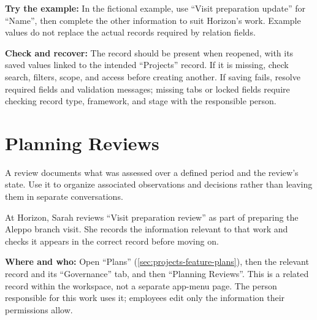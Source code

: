 \textbf{Try the example:} In the fictional example, use “Visit preparation update” for “Name”, then complete the other information to suit Horizon's work. Example values do not replace the actual records required by relation fields.

\textbf{Check and recover:} The record should be present when reopened, with its saved values linked to the intended “Projects” record. If it is missing, check search, filters, scope, and access before creating another. If saving fails, resolve required fields and validation messages; missing tabs or locked fields require checking record type, framework, and stage with the responsible person.

\clearpage
\section{Planning Reviews}
\label{sec:projects-feature-planning-reviews}

A review documents what was assessed over a defined period and the review's state. Use it to organize associated observations and decisions rather than leaving them in separate conversations.

\begin{rcnote}
At Horizon, Sarah reviews “Visit preparation review” as part of preparing the Aleppo branch visit. She records the information relevant to that work and checks it appears in the correct record before moving on.
\end{rcnote}

\textbf{Where and who:} Open “Plans” (\ref{sec:projects-feature-plans}), then the relevant record and its “Governance” tab, and then “Planning Reviews”. This is a related record within the workspace, not a separate app-menu page. The person responsible for this work uses it; employees edit only the information their permissions allow.


